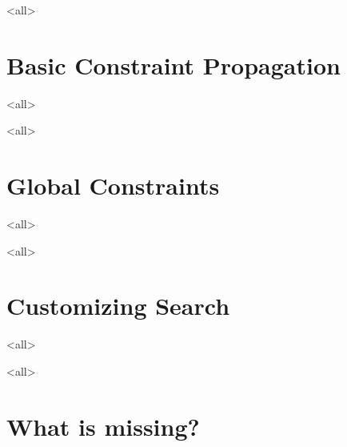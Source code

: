 \mode<all>{
\part{Basic Constraint Propagation}
}
\begin{frame}
\partpage
\end{frame}
\mode<all>{

}

\mode<all>{
\part{Global Constraints}
}
\begin{frame}
\partpage
\end{frame}
\mode<all>{

}

\clearpage
\mode<all>{
\part{Customizing Search}
}
\begin{frame}
\partpage
\end{frame}
\mode<all>{

}





\clearpage
\mode<all>{
\part{What is missing?}
}
\begin{frame}
\partpage
\end{frame}

